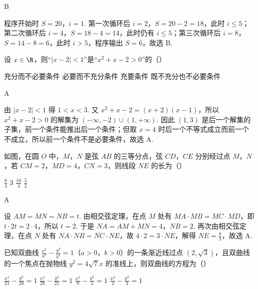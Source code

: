 \begin{answer}
B
\end{answer}

\begin{solution}
程序开始时 \(S=20\)，\(i=1\). 第一次循环后 \(i=2\)，\(S=20-2=18\)，此时 \(i\leqslant5\)；第二次循环后 \(i=4\)，\(S=18-4=14\)，此时仍有 \(i\leqslant5\)；第三次循环后 \(i=8\)，\(S=14-8=6\)，此时 \(i>5\)，程序输出 \(S=6\)，故选 B.
\end{solution}

\begin{problem}
设 \(x \in \R\)，则“\(|x - 2| < 1\)”是“\(x^2 + x - 2 > 0\)”的（\quad）

\choices
    {充分而不必要条件}
    {必要而不充分条件}
    {充要条件}
    {既不充分也不必要条件}
\end{problem}

\begin{answer}
A
\end{answer}

\begin{solution}
由 \(|x-2|<1\) 得 \(1<x<3\). 又 \(x^2+x-2=(x+2)(x-1)\)，所以 \(x^2+x-2>0\) 的解集为 \((-\infty,-2)\cup(1,+\infty)\). 因此 \((1,3)\) 是后一个解集的子集，前一个条件能推出后一个条件；但取 \(x=4\) 时后一个不等式成立而前一个不成立，所以前一个条件不是必要条件，故选 A.
\end{solution}

\begin{problem}
如图，在圆 \(O\) 中，\(M\)，\(N\) 是弦 \(AB\) 的三等分点，弦 \(CD\)，\(CE\) 分别经过点 \(M\)，\(N\)，若 \(CM = 2\)，\(MD = 4\)，\(CN = 3\)，则线段 \(NE\) 的长为（\quad）


\choices
    {\(\frac{8}{3}\)}
    {3}
    {\(\frac{10}{3}\)}
    {\(\frac{5}{2}\)}
\end{problem}

\begin{answer}
A
\end{answer}

\begin{solution}
设 \(AM=MN=NB=t\). 由相交弦定理，在点 \(M\) 处有 \(MA\cdot MB=MC\cdot MD\)，即 \(t\cdot2t=2\cdot4\)，所以 \(t=2\). 于是 \(NA=AM+MN=4\)，\(NB=2\). 再次由相交弦定理，在点 \(N\) 处有 \(NA\cdot NB=NC\cdot NE\)，故 \(4\cdot2=3\cdot NE\)，解得 \(NE=\frac{8}{3}\)，故选 A.
\end{solution}

\begin{problem}
已知双曲线 \(\frac{x^2}{a^2} - \frac{y^2}{b^2} = 1\)（\(a > 0\)，\(b > 0\)）的一条渐近线过点 \((2, \sqrt{3})\)，且双曲线的一个焦点在抛物线 \(y^2 = 4\sqrt{7} x\) 的准线上，则双曲线的方程为（\quad）

\choices
    {\(\frac{x^2}{21} -\frac{y^2}{28} = 1\)}
    {\(\frac{x^2}{28} -\frac{y^2}{21} = 1\)}
    {\(\frac{x^2}{9} -\frac{y^2}{4} = 1\)}
    {\(\frac{x^2}{4} -\frac{y^2}{3} = 1\)}
\end{problem}

